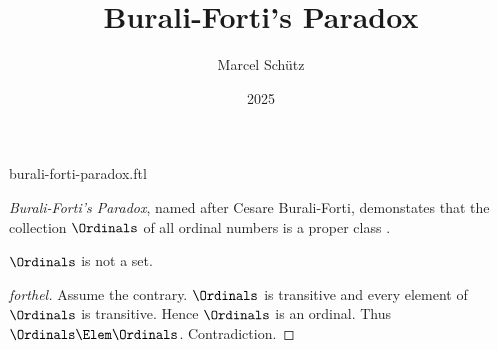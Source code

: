 \documentclass{stex}
\title{Burali-Forti's Paradox}
\author{Marcel Schütz}
\date{2025}
\begin{document}
\begin{smodule}{burali-forti-paradox.ftl}



\maketitle

\noindent \emph{Burali-Forti's Paradox}, named after Cesare Burali-Forti, 
demonstates that the collection $\Ordinals$ of all ordinal numbers is a
proper class \cite{BuraliForti1897}.

\begin{theorem}[forthel,title=Burali-Forti's Paradox,name=Burali-Forti Paradox]
  $\Ordinals$ is not a set.
\end{theorem}
\begin{proof}[forthel]
  Assume the contrary.
  $\Ordinals$ is transitive and every element of $\Ordinals$ is transitive.
  Hence $\Ordinals$ is an ordinal.
  Thus $\Ordinals \Elem \Ordinals$.
  Contradiction.
\end{proof}

\printbibliography
{}

\end{smodule}
\end{document}
